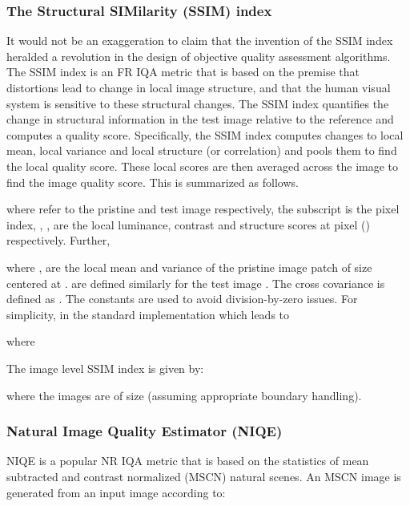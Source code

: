 \documentclass{article}
\begin{document}
\subsubsection{The Structural SIMilarity (SSIM) index}
\label{sssec:ssim}
It would not be an exaggeration to claim that the invention of the SSIM index \cite{wang2004image} heralded a revolution in the design of objective quality assessment algorithms. The SSIM index is an FR IQA metric that is based on the premise that distortions lead to change in local image structure, and that the human visual system is sensitive to these structural changes. The SSIM index quantifies the change in structural information in the test image relative to the reference and computes a quality score. Specifically, the SSIM index computes changes to local mean, local variance and local structure (or correlation) and pools them to find the local quality score. These local scores are then averaged across the image to find the image quality score. This is summarized as follows.

where  refer to the pristine and test image respectively, the subscript  is the pixel index, , ,  are the local luminance, contrast and structure scores at pixel () respectively. Further,

where
,  are the local mean and variance of the pristine image patch of size  centered at .  are defined similarly for the test image . The cross covariance is defined as . The constants  are used to avoid division-by-zero issues. For simplicity,  in the standard implementation which leads to 

where 

The image level SSIM index is given by:

where the images are of size  (assuming appropriate boundary handling).
\subsubsection{Natural Image Quality Estimator (NIQE)}
\label{sssec:niqe}
NIQE \cite{mittal2013making} is a popular NR IQA metric that is based on the statistics of mean subtracted and contrast normalized (MSCN) natural scenes. An MSCN image  is generated from an input image  according to:
\end{document}
